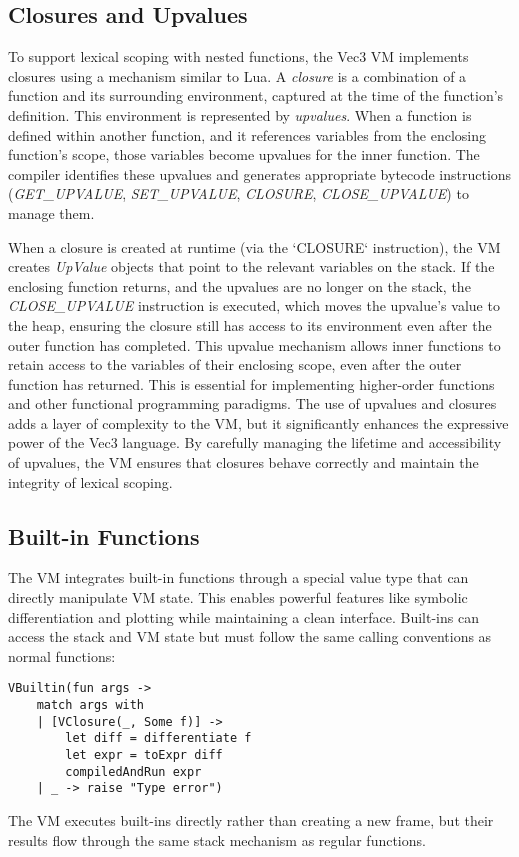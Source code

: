 \subsection{Closures and Upvalues}\label{subsec:closures-and-upvalues}
To support lexical scoping with nested functions, the Vec3 VM implements closures using a mechanism similar to Lua.
A \textit{closure} is a combination of a function and its surrounding environment, captured at the time of the function's definition.
This environment is represented by \textit{upvalues}.
When a function is defined within another function, and it references variables from the enclosing function's scope, those variables become upvalues for the inner function.
 The compiler identifies these upvalues and generates appropriate bytecode instructions (\textit{GET\_UPVALUE}, 
\textit{SET\_UPVALUE}, \textit{CLOSURE}, \textit{CLOSE\_UPVALUE}) to manage them.

When a closure is created at runtime (via the `CLOSURE` instruction), the VM creates \textit{UpValue} objects that 
point to the relevant variables on the stack.
If the enclosing function returns, and the upvalues are no longer on the stack, the \textit{CLOSE\_UPVALUE} 
instruction is 
executed, which moves the upvalue's value to the heap, ensuring the closure still has access to its environment even after the outer function has completed.
This upvalue mechanism allows inner functions to retain access to the variables of their enclosing scope, even after the outer function has returned.
This is essential for implementing higher-order functions and other functional programming paradigms.
The use of upvalues and closures adds a layer of complexity to the VM, but it significantly enhances the expressive power of the Vec3 language.
By carefully managing the lifetime and accessibility of upvalues, the VM ensures that closures behave correctly and maintain the integrity of lexical scoping.

\subsection{Built-in Functions}\label{subsec:built-in-functions}
The VM integrates built-in functions through a special value type that can directly manipulate VM state.
This enables powerful features like symbolic differentiation and plotting while maintaining a clean interface.
Built-ins can access the stack and VM state but must follow the same calling conventions as normal functions:

\begin{verbatim}
VBuiltin(fun args ->
    match args with
    | [VClosure(_, Some f)] ->
        let diff = differentiate f
        let expr = toExpr diff
        compiledAndRun expr
    | _ -> raise "Type error")
\end{verbatim}
The VM executes built-ins directly rather than creating a new frame, but their results flow through the same stack mechanism as regular functions.

